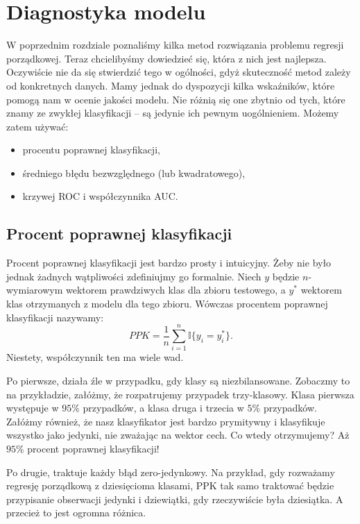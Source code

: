 \documentclass{mini}
\begin{document}

\chapter{Diagnostyka modelu}

W poprzednim rozdziale poznaliśmy kilka metod rozwiązania problemu regresji porządkowej. Teraz chcielibyśmy dowiedzieć się, która z nich jest najlepsza. Oczywiście nie da się stwierdzić tego w ogólności, gdyż skuteczność metod zależy od konkretnych danych. Mamy jednak do dyspozycji kilka wskaźników, które pomogą nam w ocenie jakości modelu. Nie różnią się one zbytnio od tych, które znamy ze zwykłej klasyfikacji -- są jedynie ich pewnym uogólnieniem. Możemy zatem używać:
\begin{itemize}
	\item procentu poprawnej klasyfikacji,
	\item średniego błędu bezwzględnego (lub kwadratowego),
	\item krzywej ROC i współczynnika AUC.	
\end{itemize} 

\section{Procent poprawnej klasyfikacji}

Procent poprawnej klasyfikacji jest bardzo prosty i intuicyjny. Żeby nie było jednak żadnych wątpliwości zdefiniujmy go formalnie. Niech $y$ będzie $n$-wymiarowym wektorem prawdziwych klas dla zbioru testowego, a $y^\ast$ wektorem klas otrzymanych z modelu dla tego zbioru. Wówczas procentem poprawnej klasyfikacji nazywamy:
\begin{equation}\label{dop1}
PPK = \frac{1}{n}\sum_{i=1}^n \mathbb{I}{\lbrace y_i=y^\ast_i \rbrace}.
\end{equation}
Niestety, współczynnik ten ma wiele wad. 

Po pierwsze, działa źle w przypadku, gdy klasy są niezbilansowane. Zobaczmy to na przykładzie, załóżmy, że rozpatrujemy przypadek trzy-klasowy. Klasa pierwsza występuje w $95\%$ przypadków, a klasa druga i trzecia w $5\%$ przypadków. Załóżmy również, że nasz klasyfikator jest bardzo prymitywny i klasyfikuje wszystko jako jedynki, nie zważając na wektor cech. Co wtedy otrzymujemy? Aż $95\%$ procent poprawnej klasyfikacji!

Po drugie, traktuje każdy błąd zero-jedynkowy. Na przykład, gdy rozważamy regresję porządkową z dziesięcioma klasami, PPK tak samo traktować będzie przypisanie obserwacji jedynki i dziewiątki, gdy rzeczywiście była dziesiątka. A przecież to jest ogromna różnica.
\end{document}
